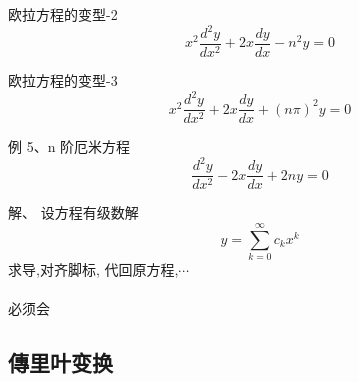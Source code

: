 \begin{frame}
          \frametitle{}
          \begin{exampleblock} {欧拉方程的变型-2}
            \begin{equation*}
             x^2 \frac{d^2 y}{d x^2} +2x \frac{d y}{d x} -n^2 y =0    
            \end{equation*}     
            \end{exampleblock}
            \begin{exampleblock} {欧拉方程的变型-3}
            \begin{equation*}
            x^2 \frac{d^2 y}{d x^2} +2x \frac{d y}{d x} +(n\pi)^2 y =0 
             \end{equation*}     
            \end{exampleblock}   

\end{frame}
\begin{frame}
        \begin{exampleblock} {例 5、n 阶厄米方程}
        \begin{equation*}
            \frac{d^2 y}{d x^2} -2x \frac{d y}{d x} +2n y =0 
        \end{equation*}     
        \end{exampleblock}	
        \alert{解、} 设方程有级数解 
        \begin{equation*}
            y=\sum_{k=0}^{\infty} c_k x^k
        \end{equation*}     
        求导,对齐脚标, 代回原方程,$\cdots $ \\
        ~~ \\       
        {\Huge \hspace*{4em} \color{red}{[X]} 必须会}
\end{frame}

\subsection{傳里叶变换}

